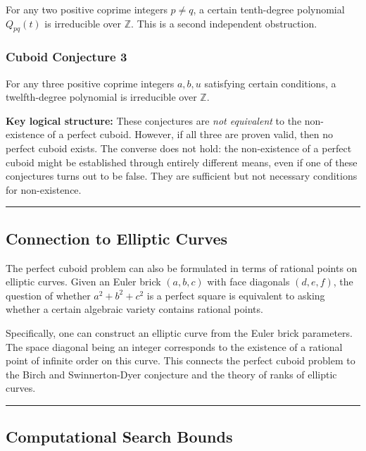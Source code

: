 \documentclass[10pt,a4paper]{article}
\begin{document}
For any two positive coprime integers $p \neq q$, a certain tenth-degree polynomial $Q_{pq}(t)$ is irreducible over $\mathbb{Z}$. This is a second independent obstruction.

\subsubsection{Cuboid Conjecture 3}

For any three positive coprime integers $a, b, u$ satisfying certain conditions, a twelfth-degree polynomial is irreducible over $\mathbb{Z}$.

\textbf{Key logical structure:} These conjectures are \emph{not equivalent} to the non-existence of a perfect cuboid. However, if all three are proven valid, then no perfect cuboid exists. The converse does not hold: the non-existence of a perfect cuboid might be established through entirely different means, even if one of these conjectures turns out to be false. They are sufficient but not necessary conditions for non-existence.

\begin{center}
\rule{0.5\textwidth}{0.4pt}
\end{center}

\subsection{Connection to Elliptic Curves}

The perfect cuboid problem can also be formulated in terms of rational points on elliptic curves. Given an Euler brick $(a, b, c)$ with face diagonals $(d, e, f)$, the question of whether $a^2 + b^2 + c^2$ is a perfect square is equivalent to asking whether a certain algebraic variety contains rational points.

Specifically, one can construct an elliptic curve from the Euler brick parameters. The space diagonal being an integer corresponds to the existence of a rational point of infinite order on this curve. This connects the perfect cuboid problem to the Birch and Swinnerton-Dyer conjecture and the theory of ranks of elliptic curves.

\begin{center}
\rule{0.5\textwidth}{0.4pt}
\end{center}

\subsection{Computational Search Bounds}
\end{document}
